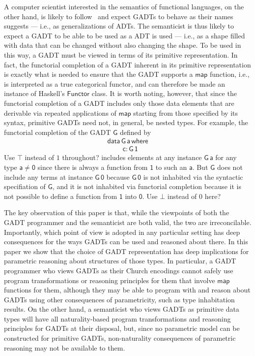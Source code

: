 \documentclass[acmsmall,screen,review,anonymous]{acmart}
\theoremstyle{definition}
\begin{document}
A computer scientist interested in the semantics of functional
languages, on the other hand, is likely to follow~\cite{bfss90} and
expect GADTs to behave as their names suggests --- i.e., as
generalizations of ADTs. The semanticist is thus likely to expect a
GADT to be able to be used as a ADT is used --- i.e., as a shape
filled with data that can be changed without also changing the
shape. To be used in this way, a GADT must be viewed in terms of its
primitive representation. In fact, the functorial completion of a GADT
inherent in its primitive representation is exactly what is needed to
ensure that the GADT supports a $\mathsf{map}$ function, i.e., is
interpreted as a true categorical functor, and can therefore be made
an instance of Haskell's $\mathsf{Functor}$ class. It is worth noting,
however, that since the functorial completion of a GADT includes only
those data elements that are derivable via repeated applications of
$\mathsf{map}$ starting from those specified by its syntax, primitive
GADTs need not, in general, be nested types. For example, the
functorial completion of the GADT $\mathsf{G}$ defined by
\begin{equation}\label{eq:G}
\begin{array}{l}
\mathsf{data\,G\,a\,where}\\
\mathsf{\;\;\;\;\;\;\;\;c : G\,1}
\end{array}
\end{equation}
{\color{blue} Use $\top$ instead of $1$ throughout?} includes elements
at any instance $\mathsf{G\,a}$ for any type $\mathsf{a} \not =
\mathsf{0}$ since there is always a function from $\mathsf{1}$ to such
an $\mathsf{a}$. But $\mathsf{G}$ does not include any terms at
instance $\mathsf{G\,0}$ because $\mathsf{G\,0}$ is not inhabited via
the syntactic specifiation of $\mathsf{G}$, and it is not inhabited
via functorial completion because it is not possible to define a
function from $\mathsf{1}$ into $\mathsf{0}$. {\color{blue} Use $\bot$
  instead of $0$ here?}

The key observation of this paper is that, while the viewpoints of
both the GADT programmer and the semanticist are both valid, the two
are irreconcilable. Importantly, which point of view is adopted in any
particular setting has deep consequences for the ways GADTs can be
used and reasoned about there. In this paper we show that the choice
of GADT representation has deep implications for parametric reasoning
about structures of those types. In particular, a GADT programmer who
views GADTs as their Church encodings cannot safely use program
transformations or reasoning principles for them that involve
$\mathsf{map}$ functions for them, although they may be able to
program with and reason about GADTs using other consequences of
parametricity, such as type inhabitation results. On the other hand, a
semanticist who views GADTs as primitive data types will have all
naturality-based program transformations and reasoning principles for
GADTs at their disposal, but, since no parametric model can be
constructed for primitive GADTs, non-naturality consequences of
parametric reasoning may not be available to them.
\end{document}
